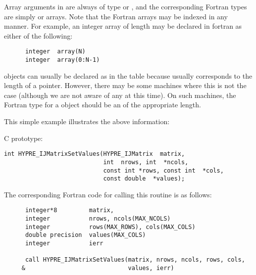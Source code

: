 Array arguments in \hypre{} are always of type  or , and the corresponding Fortran types are simply  or
 arrays.  Note that the Fortran arrays may be indexed in
any manner.  For example, an integer array of length  may be declared in
fortran as either of the following:
\begin{display}
\begin{verbatim}
      integer  array(N)
      integer  array(0:N-1)
\end{verbatim}
\end{display}

\hypre{} objects can usually be declared as in the table because
 usually corresponds to the length of a pointer.  However, there
may be some machines where this is not the case (although we are not aware of
any at this time).  On such machines, the Fortran type for a \hypre{} object
should be an  of the appropriate length.

This simple example illustrates the above information: 

C prototype:
\begin{display}
\begin{verbatim}
int HYPRE_IJMatrixSetValues(HYPRE_IJMatrix  matrix,
                            int  nrows, int  *ncols,
                            const int *rows, const int  *cols,
                            const double  *values);
\end{verbatim}
\end{display}

The corresponding Fortran code for calling this routine is as follows:
\begin{display}
\begin{verbatim}
      integer*8         matrix, 
      integer           nrows, ncols(MAX_NCOLS)
      integer           rows(MAX_ROWS), cols(MAX_COLS)
      double precision  values(MAX_COLS)
      integer           ierr

      call HYPRE_IJMatrixSetValues(matrix, nrows, ncols, rows, cols,
     &                             values, ierr)
\end{verbatim}
\end{display}

